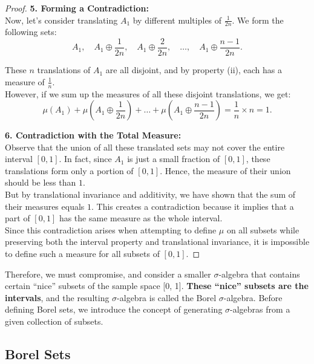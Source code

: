 \begin{proof}
\textbf{5. Forming a Contradiction:}  \\

   Now, let’s consider translating $A_1$ by different multiples of $\frac{1}{2n}$. We form the following sets:
   \[
   A_1, \quad A_1 \oplus \frac{1}{2n}, \quad A_1 \oplus \frac{2}{2n}, \quad \ldots, \quad A_1 \oplus \frac{n-1}{2n}.
   \]
   
   These $n$ translations of $A_1$ are all disjoint, and by property (ii), each has a measure of $\frac{1}{n}$.\\

   However, if we sum up the measures of all these disjoint translations, we get:
   \[
   \mu(A_1) + \mu(A_1 \oplus \frac{1}{2n}) + \ldots + \mu(A_1 \oplus \frac{n-1}{2n}) = \frac{1}{n} \times n = 1.
   \]

\textbf{6. Contradiction with the Total Measure:}  \\

   Observe that the union of all these translated sets may not cover the entire interval $[0, 1]$. In fact, since $A_1$ is just a small fraction of $[0, 1]$, these translations form only a portion of $[0, 1]$. Hence, the measure of their union should be less than $1$.\\

   But by translational invariance and additivity, we have shown that the sum of their measures equals $1$. This creates a contradiction because it implies that a part of $[0, 1]$ has the same measure as the whole interval.\\

   Since this contradiction arises when attempting to define $\mu$ on all subsets while preserving both the interval property and translational invariance, it is impossible to define such a measure for all subsets of $[0, 1]$. 
\end{proof}

Therefore, we must compromise, and consider a smaller $\sigma$-algebra that contains certain “nice” subsets of the sample space [0, 1]. \textbf{These “nice” subsets are the intervals}, and the resulting $\sigma$-algebra is called the Borel $\sigma$-algebra. Before defining Borel sets, we introduce the concept of generating $\sigma$-algebras from a given collection of subsets.


\subsection{Borel Sets}

